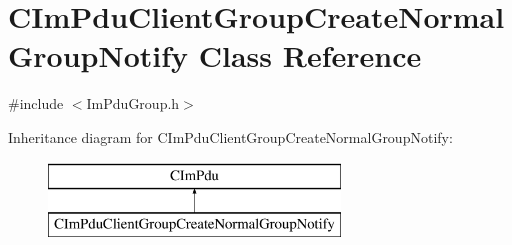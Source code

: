 \hypertarget{class_c_im_pdu_client_group_create_normal_group_notify}{}\section{C\+Im\+Pdu\+Client\+Group\+Create\+Normal\+Group\+Notify Class Reference}
\label{class_c_im_pdu_client_group_create_normal_group_notify}


{\ttfamily \#include $<$Im\+Pdu\+Group.\+h$>$}

Inheritance diagram for C\+Im\+Pdu\+Client\+Group\+Create\+Normal\+Group\+Notify\+:\begin{figure}[H]
\begin{center}
\leavevmode
\includegraphics[height=2.000000cm]{class_c_im_pdu_client_group_create_normal_group_notify}
\end{center}
\end{figure}
